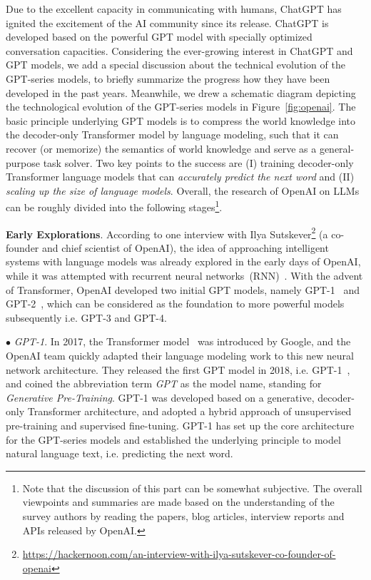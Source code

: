 Due to the  excellent capacity in communicating  with humans,  ChatGPT has ignited the excitement of the AI community since its release. ChatGPT is developed based on the powerful GPT model with specially optimized conversation  capacities. Considering the ever-growing interest in ChatGPT and GPT models, we add a special discussion about the technical evolution of the GPT-series models, to briefly summarize the progress how they have been developed in the past years. {Meanwhile, we drew a schematic diagram depicting the technological evolution of the GPT-series models in Figure~\ref{fig:openai}.} 
The basic principle underlying GPT models is to compress the world knowledge into the decoder-only Transformer model by language modeling,  such that it can  recover (or memorize) the semantics of world knowledge and serve as a general-purpose task solver. Two key points to the success are  (I)   training decoder-only Transformer language models that can \emph{accurately predict the next word}  and (II) \emph{scaling  up the size of  language models}. Overall, the research of OpenAI on LLMs can be roughly divided into the following stages\footnote{Note that the discussion of this part can be somewhat subjective. The overall viewpoints and summaries are made based on the understanding of the survey authors by reading  the papers, blog articles, interview reports and APIs released by OpenAI.  }.  

\textbf{Early Explorations}. According to one interview with Ilya Sutskever\footnote{\url{https://hackernoon.com/an-interview-with-ilya-sutskever-co-founder-of-openai}} (a co-founder and chief scientist of OpenAI), the idea of approaching  intelligent systems  with language models was already explored in the early days of OpenAI, while it was attempted with recurrent neural networks~(RNN)~\cite{Radford-CoRR-2017-Learning}. With the advent of Transformer, OpenAI developed two initial GPT models, namely GPT-1~\cite{radford-openai-2018-improving} and GPT-2~\cite{radford-blog-2019-language}, which can be considered as the foundation to  more powerful models subsequently i.e. GPT-3 and GPT-4.   

$\bullet$ \emph{GPT-1}. In 2017, the Transformer model~\cite{Vaswani-NIPS-2017-Attention} was introduced by Google, and the OpenAI team quickly adapted their language modeling work to this new neural network architecture. They released the first GPT model in 2018, i.e. GPT-1~\cite{radford-openai-2018-improving}, and coined the abbreviation term \emph{GPT} as the model name,  standing for \emph{Generative Pre-Training}. GPT-1 was developed based on a generative, decoder-only Transformer architecture, and adopted a hybrid  approach of  unsupervised pre-training and supervised fine-tuning. GPT-1 has set up the core architecture for the GPT-series models and established the underlying principle to model natural language text, i.e. predicting the next word.  

